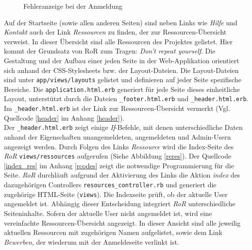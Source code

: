 \documentclass[a4paper,12pt,parskip,bibtotoc,liststotoc]{article}
\begin{document}
\begin{figure}[h!]
  \begin{center}
    \caption{Fehleranzeige bei der Anmeldung}  \label{Fehler}
  \end{center}
\end{figure}

Auf der Startseite (sowie allen anderen Seiten) sind neben Links wie \textit{Hilfe} und \textit{Kontakt} auch der Link \textit{Ressourcen} zu finden, der zur Ressourcen-Übersicht verweist. In dieser Übersicht sind alle Ressourcen des Projektes gelistet. Hier kommt der Grundsatz von RoR zum Tragen: \textit{Don’t repeat yourself}. Die Gestaltung und der Aufbau einer jeden Seite in der Web-Applikation orientiert sich anhand der CSS-Stylesheets bzw. der Layout-Dateien. Die Layout-Dateien sind unter \texttt{app/views/layouts} gelistet und definieren auf jeder Seite spezifische Bereiche. Die \texttt{application.html.erb} generiert für jede Seite dieses einheitliche Layout, unterstützt durch die Dateien \texttt{\_footer.html.erb} und \texttt{\_header.html.erb}. Im \texttt{\_header.html.erb} ist der Link zur Ressourcen-Übersicht vermerkt (Vgl. Quellcode \ref{header} im Anhang \ref{header}).\\

Der \texttt{\_header.html.erb} zeigt einige \textit{If}-Befehle, mit denen unterschiedliche Daten anhand der Eigenschaften unangemeldeten, angemeldeten und Admin-Usern angezeigt werden. Durch Folgen des Links \textit{Ressource} wird die Index-Seite des \textit{RoR} \texttt{views/ressources} aufgerufen (Siehe Abbildung \ref{reres}). Der Quellcode \ref{index_res} im Anhang \ref{rcodes} zeigt die notwendige Programmierung für die Seite. \textit{RoR} durchläuft aufgrund der Aktivierung des Links die Aktion \textit{index} des dazugehörigen Controllers \texttt{resources\_controller.rb} und generiert die zugehörige HTML-Seite (\texttt{views}). Die Indexseite prüft, ob der aktuelle User angemeldet ist. Abhängig dieser Entscheidung integriert \textit{RoR} unterschiedliche Seiteninhalte. Sofern der aktuelle User nicht angemeldet ist, wird eine vereinfachte Ressourcen-Übersicht angezeigt. In dieser Ansicht sind alle jeweilig aktuellen Ressourcen mit zugehörigen Namen aufgelistet, sowie dem Link \textit{Bewerben}, der wiederum mit der Anmeldeseite verlinkt ist.\\
\end{document}
